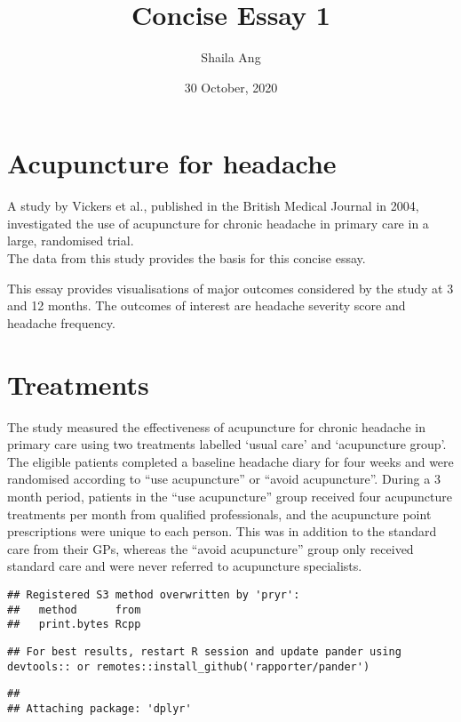 \documentclass[
]{article}
\title{Concise Essay 1}
\author{Shaila Ang}
\date{30 October, 2020}
\begin{document}
\maketitle

\hypertarget{acupuncture-for-headache}{%
\section{Acupuncture for headache}\label{acupuncture-for-headache}}

A study by Vickers et al., published in the British Medical Journal in
2004, investigated the use of acupuncture for chronic headache in
primary care in a large, randomised trial.\\
The data from this study provides the basis for this concise essay.

This essay provides visualisations of major outcomes considered by the
study at 3 and 12 months. The outcomes of interest are headache severity
score and headache frequency.

\hypertarget{treatments}{%
\section{Treatments}\label{treatments}}

The study measured the effectiveness of acupuncture for chronic headache
in primary care using two treatments labelled `usual care' and
`acupuncture group'. The eligible patients completed a baseline headache
diary for four weeks and were randomised according to ``use
acupuncture'' or ``avoid acupuncture''. During a 3 month period,
patients in the ``use acupuncture'' group received four acupuncture
treatments per month from qualified professionals, and the acupuncture
point prescriptions were unique to each person. This was in addition to
the standard care from their GPs, whereas the ``avoid acupuncture''
group only received standard care and were never referred to acupuncture
specialists.

\begin{verbatim}
## Registered S3 method overwritten by 'pryr':
##   method      from
##   print.bytes Rcpp
\end{verbatim}

\begin{verbatim}
## For best results, restart R session and update pander using devtools:: or remotes::install_github('rapporter/pander')
\end{verbatim}

\begin{verbatim}
## 
## Attaching package: 'dplyr'
\end{verbatim}
\end{document}
